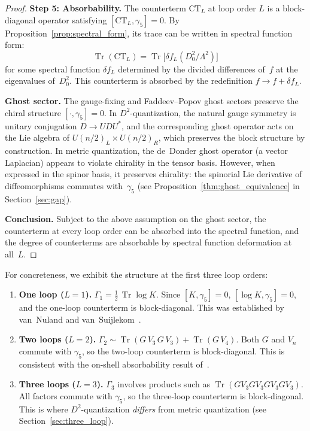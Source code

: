 \documentclass[12pt,a4paper]{article}
\theoremstyle{definition}
\theoremstyle{remark}
\newcommand{\Tr}{\operatorname{Tr}}
\newcommand{\half}{\tfrac{1}{2}}
\newcommand{\Lam}{\Lambda}
\begin{document}
\begin{proof}
\medskip\noindent\textbf{Step 5: Absorbability.}
The counterterm $\mathrm{CT}_L$ at loop order $L$ is a block-diagonal
operator satisfying $[\mathrm{CT}_L, \gamma_5] = 0$.  By
Proposition~\ref{prop:spectral_form}, its trace can be written in spectral
function form:
\begin{equation}\label{eq:absorbable}
  \Tr(\mathrm{CT}_L) = \Tr\bigl[\delta f_L(D_0^2/\Lam^2)\bigr]
\end{equation}
for some spectral function $\delta f_L$ determined by the divided differences
of~$f$ at the eigenvalues of~$D_0^2$.  This counterterm is absorbed by the
redefinition $f \to f + \delta f_L$.

\medskip\noindent\textbf{Ghost sector.}
The gauge-fixing and Faddeev--Popov ghost sectors preserve the chiral
structure $[\cdot, \gamma_5] = 0$.  In $D^2$-quantization, the natural gauge
symmetry is unitary conjugation $D \to UDU^*$, and the corresponding ghost
operator acts on the Lie algebra of $U(n/2)_L \times U(n/2)_R$, which
preserves the block structure by construction.  In metric quantization,
the de~Donder ghost operator (a vector Laplacian) appears to violate
chirality in the tensor basis.  However, when expressed in the spinor basis,
it preserves chirality: the spinorial Lie derivative of diffeomorphisms
commutes with~$\gamma_5$ (see
Proposition~\ref{thm:ghost_equivalence} in Section~\ref{sec:gap}).

\medskip\noindent\textbf{Conclusion.}
Subject to the above assumption on the ghost sector, the counterterm at every
loop order can be absorbed into the spectral function, and the degree of
counterterms are absorbable by spectral function deformation at all~$L$.
\end{proof}

\medskip

For concreteness, we exhibit the structure at the first three loop orders:

\begin{enumerate}
  \item \textbf{One loop ($L = 1$).}
  $\Gamma_1 = \half\,\Tr\log K$.  Since $[K, \gamma_5] = 0$,
  $[\log K, \gamma_5] = 0$, and the one-loop counterterm is block-diagonal.
  This was established by van~Nuland and
  van~Suijlekom~\cite{vanNuland:2021oneloop}.

  \item \textbf{Two loops ($L = 2$).}
  $\Gamma_2 \sim \Tr(G\,V_3\,G\,V_3) + \Tr(G\,V_4)$.
  Both $G$ and $V_n$ commute with $\gamma_5$, so the two-loop counterterm is
  block-diagonal.  This is consistent with the on-shell absorbability
  result of~\cite{Alfyorov:2026ct}.

  \item \textbf{Three loops ($L = 3$).}
  $\Gamma_3$ involves products such as $\Tr(G V_3 G V_3 G V_3 G V_3)$.
  All factors commute with $\gamma_5$, so the three-loop counterterm is
  block-diagonal.  This is where $D^2$-quantization \emph{differs} from metric
  quantization (see Section~\ref{sec:three_loop}).
\end{enumerate}
\end{document}
